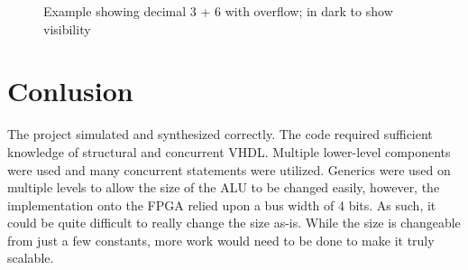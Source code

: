 \documentclass[12pt]{article}
\begin{document}
\begin{figure}[H]
\begin{center}
\caption{Example showing decimal 3 + 6 with overflow; in dark to show visibility}
\label{fig:boardsimdark}
\end{center}
\end{figure}

\section{Conlusion} \label{cncl}
The project simulated and synthesized correctly.  The code required sufficient knowledge of structural and concurrent VHDL.  Multiple lower-level components were used and many concurrent statements were utilized.  Generics were used on multiple levels to allow the size of the ALU to be changed easily, however, the implementation onto the FPGA relied upon a bus width of 4 bits.  As such, it could be quite difficult to really change the size as-is.  While the size is changeable from  just a few constants, more work would need to be done to make it truly scalable.
\end{document}
